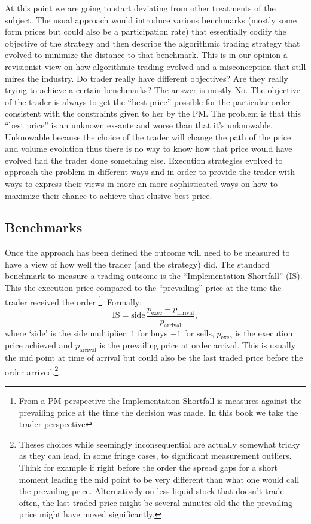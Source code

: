 At this point we are going to start deviating from other treatments of the subject. The usual approach  would introduce various benchmarks (mostly some form prices but could also be a participation rate) that essentially codify the objective of the strategy and then describe the algorithmic trading strategy that evolved to minimize the distance to that benchmark. This is in our opinion a revisionist view on how algorithmic trading evolved and a misconception that still mires the industry. Do trader really have different objectives? Are they really trying to achieve a certain benchmarks? The answer is mostly No. The objective of the trader is always to get the ``best price'' possible for the particular order consistent with the constraints given to her by the PM. The problem is that this ``best price''  is an unknown ex-ante and worse than that it's unknowable. Unknowable because the choice of the trader will change the path of the price and volume evolution thus there is no way to know how that price would have evolved had the trader done something else. Execution strategies evolved to approach the problem in  different ways  and in order to provide the trader with ways to express their views in more an more sophisticated ways on how to maximize their chance to achieve that elusive best price.


\subsection{Benchmarks}

Once the approach has been defined the outcome will need to be measured to have a view of how well the trader (and the strategy) did. The standard benchmark to measure a trading outcome is the ``Implementation Shortfall'' (IS). This the execution price compared to the ``prevailing'' price at the time the trader received the order \footnote{From a PM perspective the Implementation Shortfall is measures against the prevailing price at the time the decision was made. In this book we take the trader perspective}. Formally:
        \begin{equation}
        \text{IS} = \text{side}\, \frac{p_{\text{exec}} - p_{\text{arrival}}}{p_{\text{arrival}}},
        \end{equation}
where `side' is the side multiplier: $1$ for buys $-1$ for sells, $p_{\text{exec}}$ is the execution price achieved and $p_{\text{arrival}}$ is the prevailing price at order arrival. This is usually the mid point at time of arrival but could also be the last traded price before the order arrived.\footnote{Theses choices while seemingly inconsequential are actually somewhat tricky as they can lead, in some fringe cases, to significant measurement outliers. Think for example if right before the order the spread gaps for a short moment leading the mid point to be very different than what one would call the prevailing price. Alternatively on less liquid stock that doesn't trade often, the last traded price might be several minutes old the the prevailing price might have moved significantly.}



